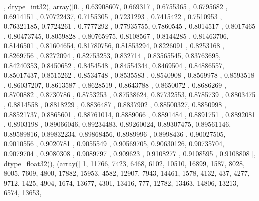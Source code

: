 \documentclass[letterpaper,10pt,english]{jupyterBook}
\begin{document}
\begin{sphinxVerbatim}[commandchars=\\\{\}]
[(array([    0, 18553, 11184, 16876, 11946, 16873, 11485,  2729, 11312,
          6760,  7949, 17776, 13476,  3309,  2867,  8311, 12784,  1154,
          7476,  7330,  8755, 13588, 13897, 17132,  6839,  3787,  3042,
           629, 15810, 18704,   333,  3925,  9968, 16990,  8496,  2361,
          6424, 15497,  9822, 11135, 13042, 18583,  5707, 15814,  7020,
          7142, 11961, 11029,  1803, 11246, 10832, 14097, 10344, 15032,
          7931, 13927,   458, 17853, 16067, 14836,  4506, 12084,  2853,
          4459, 15130, 17520, 16621, 10478, 13146, 13207,  8265, 15036,
         12512,  7803, 17900,  6566, 17040,  3349,     7, 13893,  2967,
         14123, 12769, 17020, 18590,  1898, 10391, 14628,  1469, 13250,
          1431, 16369,  3068, 10040, 11045, 10974, 15167,  9902,  6613,
           959], dtype=int32),
  array([0.        , 0.63908607, 0.669317  , 0.6755365 , 0.6795682 ,
         0.6914151 , 0.70722437, 0.7155305 , 0.7231293 , 0.7415422 ,
         0.7510953 , 0.76321185, 0.7724261 , 0.7777292 , 0.77935755,
         0.7860545 , 0.8014517 , 0.8017465 , 0.80473745, 0.8059828 ,
         0.80765975, 0.8108567 , 0.8144285 , 0.81463706, 0.8146501 ,
         0.81604654, 0.81780756, 0.81853294, 0.8226091 , 0.8253168 ,
         0.8269756 , 0.8272094 , 0.82753253, 0.832714  , 0.83565545,
         0.83763695, 0.84240353, 0.8450652 , 0.8454548 , 0.84554344,
         0.8469504 , 0.84886557, 0.85017437, 0.8515262 , 0.8534748 ,
         0.8535583 , 0.8540908 , 0.8569978 , 0.8593518 , 0.86037207,
         0.8613587 , 0.8628519 , 0.8643788 , 0.8650072 , 0.8686269 ,
         0.8700882 , 0.8730786 , 0.8753253 , 0.87538624, 0.87732553,
         0.8785739 , 0.8803475 , 0.8814558 , 0.8818229 , 0.8836487 ,
         0.8837902 , 0.88500327, 0.8850998 , 0.88521737, 0.8865601 ,
         0.88761014, 0.8889066 , 0.8891484 , 0.8891751 , 0.8892081 ,
         0.8903198 , 0.89066046, 0.89234483, 0.89260024, 0.89307475,
         0.89561146, 0.89589816, 0.89832234, 0.89868456, 0.8989996 ,
         0.8998436 , 0.90027505, 0.9010556 , 0.9020781 , 0.9055549 ,
         0.90569705, 0.90630126, 0.90735704, 0.9079704 , 0.9080308 ,
         0.9089797 , 0.909623  , 0.9108277 , 0.9108595 , 0.9108808 ],
        dtype=float32)),
 (array([    1, 11766,  7423,  6468,  6102, 10510, 16899,  1587,  8028,
          8005,  7609,  4800, 17882, 15953,  4582, 12907,  7943, 14461,
          1578,  4132,   437,  4277,  9712,  1425,  4904,  1674, 13677,
          4301, 13416,   777, 12782, 13463, 14806, 13213,  6574, 13653,

\end{sphinxVerbatim}
\end{document}
